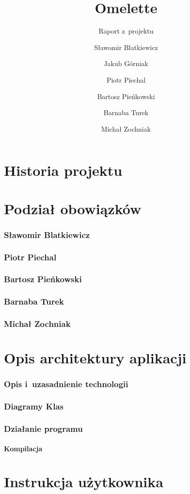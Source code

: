 \documentclass[a4paper]{scrartcl}
\begin{document}
\sloppy

\title{Omelette}
\subtitle{Raport z~projektu}
\author{
  Sławomir Blatkiewicz\and
  Jakub Górniak       \and
  Piotr Piechal       \and
  Bartosz Pieńkowski  \and
  Barnaba Turek       \and
  Michał Zochniak
}
\maketitle

\part{Historia projektu}



\part{Podział obowiązków}
\section{Sławomir Blatkiewicz}

\section{Piotr Piechal}

\section{Bartosz Pieńkowski}

\section{Barnaba Turek}

\section{Michał Zochniak}


\part{Opis architektury aplikacji}
\section{Opis i~uzasadnienie technologii}

\section{Diagramy Klas}

\section{Działanie programu}
\subsection{Kompilacja}


\part{Instrukcja użytkownika}


\end{document}

